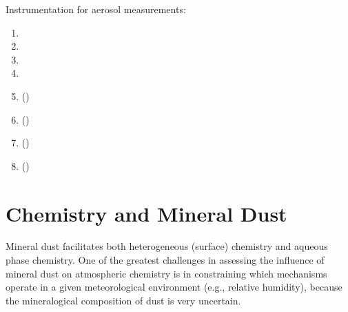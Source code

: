 \documentclass[12pt,twoside]{book}
\begin{document}
Instrumentation for aerosol measurements:
\begin{enumerate}
\item {}
\item {}
\item {}
\item {}
\item {} ()
\item {} ()
\item {} ()
\item {} ()
\end{enumerate}

\chapter{Chemistry and Mineral Dust}\label{sxn:chm_htr_dst}
Mineral dust facilitates both heterogeneous (surface) chemistry and 
aqueous phase chemistry.
One of the greatest challenges in assessing the influence of mineral
dust on atmospheric chemistry is in constraining which mechanisms
operate in a given meteorological environment (e.g., relative
humidity), because the mineralogical composition of dust is very
uncertain. 
\end{document}
